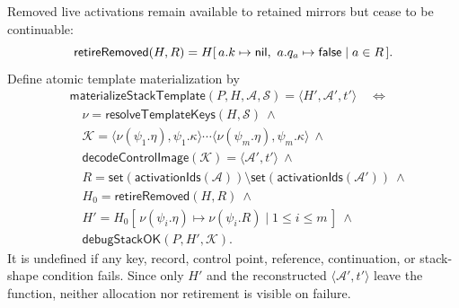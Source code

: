 Removed live activations remain available to retained mirrors but cease to be
continuable:
\begin{equation}\label{eq:retire-removed-stack-activations}
 \mathsf{retireRemoved}(H,R)=
 H[\,a.k\mapsto\mathsf{nil},\ a.q_a\mapsto\mathsf{false}\mid a\in R\,].
\end{equation}
Define atomic template materialization by
\begin{equation}\label{eq:materialize-stack-template}
\begin{split}
 &\mathsf{materializeStackTemplate}(P,H,\mathcal A,\mathcal S)
      =\langle H',\mathcal A',t'\rangle
 \quad\Longleftrightarrow\\
 &\quad\nu=\mathsf{resolveTemplateKeys}(H,\mathcal S)\ \land\\
 &\quad\mathcal K=
   \langle\nu(\psi_1.\eta),\psi_1.\kappa\rangle\cdots
   \langle\nu(\psi_m.\eta),\psi_m.\kappa\rangle\ \land\\
 &\quad\mathsf{decodeControlImage}(\mathcal K)
      =\langle\mathcal A',t'\rangle\ \land\\
 &\quad R=\mathsf{set}(\mathsf{activationIds}(\mathcal A))
       \setminus\mathsf{set}(\mathsf{activationIds}(\mathcal A'))\ \land\\
 &\quad H_0=\mathsf{retireRemoved}(H,R)\ \land\\
 &\quad H'=H_0[\,\nu(\psi_i.\eta)\mapsto\nu(\psi_i.R)
          \mid1\le i\le m\,]\ \land\\
 &\quad\mathsf{debugStackOK}(P,H',\mathcal K).
\end{split}
\end{equation}
It is undefined if any key, record, control point, reference, continuation, or
stack-shape condition fails.  Since only $H'$ and the reconstructed
$\langle\mathcal A',t'\rangle$ leave the function, neither allocation nor
retirement is visible on failure.

